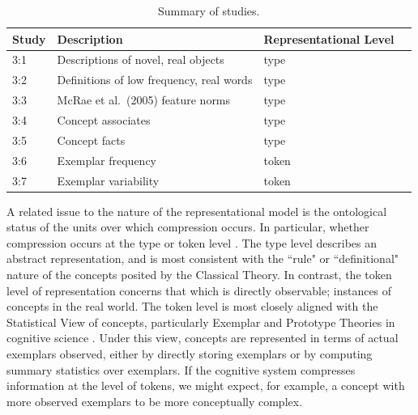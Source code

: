 \begin{table}[t]
\footnotesize
\centering
\begin{tabular}{l l l l  }
 \toprule
 \textbf{Study} &  \textbf{Description} & \textbf{Representational Level}  \\
 \toprule

3:1  & Descriptions of novel, real objects & type   \\
3:2  & Definitions of low frequency, real words & type \\
3:3  & McRae et al.\ (2005) feature norms & type  \\
3:4  & Concept associates & type    \\
3:5  & Concept facts & type  \\
3:6  & Exemplar frequency& token   \\
3:7  & Exemplar variability & token  \\
 \bottomrule
\end{tabular}
\caption{Summary of studies.}
\label{tab:complexity_pred_summary_table}
\end{table}



 
A related issue to the nature of the representational model is the ontological status of the units over which compression occurs. In particular, whether compression occurs at the type or token level \cite{peirce}. The type level describes an abstract representation, and is most consistent with the ``rule" or ``definitional" nature of the concepts posited by the Classical Theory. In contrast, the token level of representation concerns that which is directly observable; instances of concepts in the real world.  The token level is most closely aligned with the Statistical View of concepts, particularly Exemplar and Prototype Theories in cognitive science  \cite{laurence1999concepts}. Under this view, concepts are represented in terms of actual exemplars observed, either by directly storing exemplars or by computing summary statistics over exemplars. If the cognitive system compresses information at the level of tokens, we might expect, for example, a concept with more observed exemplars to be more conceptually complex. 

